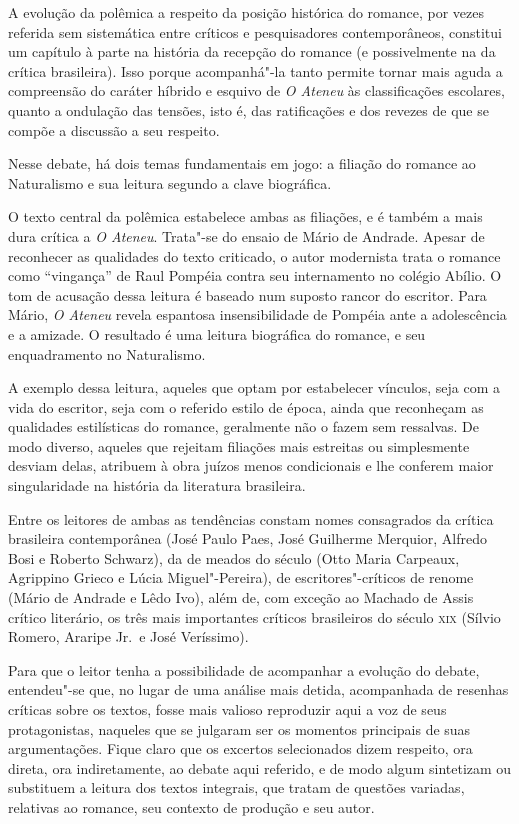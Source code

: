 A evolução da polêmica a respeito da posição histórica
do romance, por vezes referida sem sistemática entre críticos e
pesquisadores contemporâneos, constitui um capítulo à parte na história
da recepção do romance (e possivelmente na da crítica brasileira). Isso
porque acompanhá"-la  tanto permite tornar mais aguda a compreensão do
caráter híbrido e esquivo de \textit{O Ateneu} às classificações escolares, quanto a
ondulação das tensões, isto é, das ratificações e dos revezes de que se
compõe a discussão a seu respeito. 

Nesse debate, há dois temas fundamentais em jogo: a filiação do romance
ao Naturalismo e sua leitura segundo a clave biográfica. 

O texto central da polêmica estabelece ambas as filiações, e é também a
mais dura crítica a \textit{O Ateneu}. Trata"-se do ensaio de Mário de
Andrade. Apesar de reconhecer as qualidades do texto criticado, o autor
modernista trata o romance como ``vingança'' de Raul Pompéia contra seu
internamento no colégio Abílio. O tom de acusação dessa leitura é
baseado num suposto rancor do escritor. Para Mário, \textit{O Ateneu}
revela espantosa insensibilidade de Pompéia ante a adolescência e a
amizade. O resultado é uma leitura biográfica do romance, e seu
enquadramento no Naturalismo. 

A exemplo dessa leitura, aqueles que optam por estabelecer vínculos,
seja com a vida do escritor, seja com o referido estilo de época, ainda
que reconheçam as qualidades estilísticas do romance, geralmente não o
fazem sem ressalvas. De modo diverso, aqueles que rejeitam filiações
mais estreitas ou simplesmente desviam delas, atribuem à obra juízos
menos condicionais e lhe conferem maior singularidade na história da
literatura brasileira.

Entre os leitores de ambas as tendências constam nomes consagrados da
crítica brasileira contemporânea (José Paulo Paes, José Guilherme
Merquior, Alfredo Bosi e Roberto Schwarz), da de meados do século (Otto
Maria Carpeaux, Agrippino Grieco e Lúcia Miguel"-Pereira), de
escritores"-críticos de renome (Mário de Andrade e Lêdo Ivo), além de,
com exceção ao Machado de Assis crítico literário, os três mais
importantes críticos brasileiros do século \textsc{xix} (Sílvio Romero, Araripe
Jr.~e José Veríssimo).

Para que o leitor tenha a possibilidade de acompanhar a evolução do
debate, entendeu"-se que, no lugar de uma análise mais detida,
acompanhada de resenhas críticas sobre os textos, fosse mais valioso
reproduzir aqui a voz de seus protagonistas, naqueles que se julgaram
ser os momentos principais de suas argumentações. Fique claro que os
excertos selecionados dizem respeito, ora direta, ora indiretamente, ao
debate aqui referido, e de modo algum sintetizam ou substituem a
leitura dos textos integrais, que tratam de questões variadas,
relativas ao romance, seu contexto de produção e seu autor.

